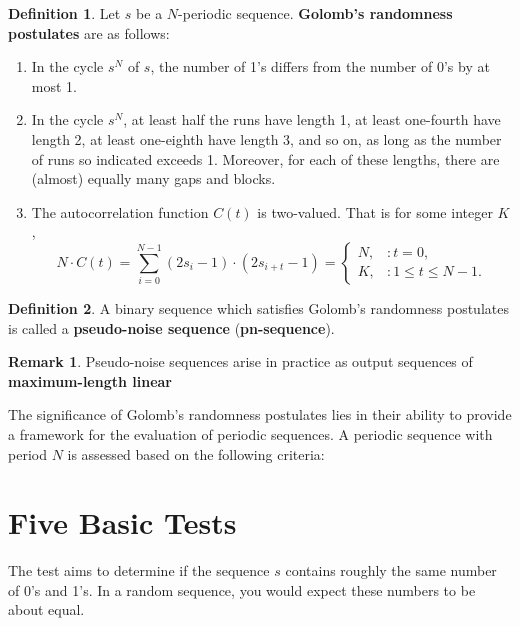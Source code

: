 \documentclass[12pt,openany]{book}
\theoremstyle{definition}
\newtheorem{definition}{Definition}[chapter]
\newtheorem{remark}{Remark}[chapter]
\begin{document}
\begin{tcolorbox}[colback=white,colframe=defcolor,arc=5pt,title={\color{white}\bf Golomb's randomness postulates}]
	\begin{definition}
		Let \( s \) be a $N$-periodic sequence. \textbf{Golomb's randomness postulates} are as follows:
		\begin{enumerate}[\textbf{R}1]
			\item In the cycle \( s^N \) of \( s \), the number of 1’s differs from the number of 0’s by at most 1.
			\item In the cycle \( s^N \), at least half the runs have length 1, at least one-fourth have length 2, at least one-eighth have length 3, and so on, as long as the number of runs so indicated exceeds 1. Moreover, for each of these lengths, there are (almost) equally many gaps and blocks.
			\item The autocorrelation function \( C(t) \) is two-valued. That is for some integer \( K \),
			\[
			N \cdot C(t) = \sum_{i=0}^{N-1}(2s_i - 1) \cdot (2s_{i+t} - 1)=
			\begin{cases} 
				N, & : t = 0, \\
				K, & : 1 \leq t \leq N - 1.
			\end{cases}
			\]
		\end{enumerate}
	\end{definition}
\end{tcolorbox}

\begin{tcolorbox}[colback=white,colframe=defcolor,arc=5pt,title={\color{white}\bf \textbf{Pseudo-Noise Sequence} (\textbf{pn-sequence})}]
	\begin{definition}
		A binary sequence which satisfies Golomb's randomness postulates is called a \textbf{pseudo-noise sequence} (\textbf{pn-sequence}).
	\end{definition}
\end{tcolorbox}
\begin{remark}
	Pseudo-noise sequences arise in practice as output sequences of \textbf{maximum-length linear }
\end{remark}

The significance of Golomb’s randomness postulates lies in their ability to provide a framework for the evaluation of periodic sequences. A periodic sequence with period \( N \) is assessed based on the following criteria:


\newpage
\section{Five Basic Tests}
The test aims to determine if the sequence 
$s$ contains roughly the same number of 0's and 1's. In a random sequence, you would expect these numbers to be about equal.
\end{document}
